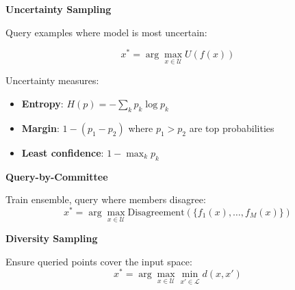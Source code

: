 \textbf{Uncertainty Sampling}

Query examples where model is most uncertain:

\begin{equation}
    x^* = \arg\max_{x \in \mathcal{U}} U(f(x))
\end{equation}

Uncertainty measures:
\begin{itemize}
    \item \textbf{Entropy}: $H(p) = -\sum_k p_k \log p_k$
    \item \textbf{Margin}: $1 - (p_1 - p_2)$ where $p_1 > p_2$ are top probabilities
    \item \textbf{Least confidence}: $1 - \max_k p_k$
\end{itemize}

\textbf{Query-by-Committee}

Train ensemble, query where members disagree:
\begin{equation}
    x^* = \arg\max_{x \in \mathcal{U}} \text{Disagreement}(\{f_1(x), \ldots, f_M(x)\})
\end{equation}

\textbf{Diversity Sampling}

Ensure queried points cover the input space:
\begin{equation}
    x^* = \arg\max_{x \in \mathcal{U}} \min_{x' \in \mathcal{L}} d(x, x')
\end{equation}

